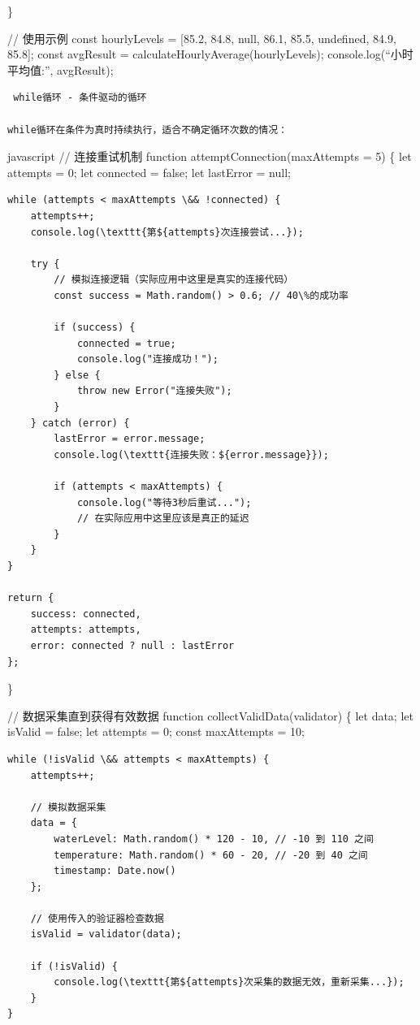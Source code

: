 {\}

// 使用示例 const hourlyLevels = {[}85.2, 84.8, null, 86.1, 85.5, undefined, 84.9, 85.8{]}; const avgResult = calculateHourlyAverage(hourlyLevels); console.log(``小时平均值:'', avgResult);

\begin{lstlisting}
 while循环 - 条件驱动的循环

while循环在条件为真时持续执行，适合不确定循环次数的情况：
\end{lstlisting}

javascript // 连接重试机制 function attemptConnection(maxAttempts = 5) \{ let attempts = 0; let connected = false; let lastError = null;

\begin{verbatim}
while (attempts < maxAttempts \&& !connected) {
    attempts++;
    console.log(\texttt{第${attempts}次连接尝试...});
    
    try {
        // 模拟连接逻辑（实际应用中这里是真实的连接代码）
        const success = Math.random() > 0.6; // 40\%的成功率
        
        if (success) {
            connected = true;
            console.log("连接成功！");
        } else {
            throw new Error("连接失败");
        }
    } catch (error) {
        lastError = error.message;
        console.log(\texttt{连接失败：${error.message}});
        
        if (attempts < maxAttempts) {
            console.log("等待3秒后重试...");
            // 在实际应用中这里应该是真正的延迟
        }
    }
}

return {
    success: connected,
    attempts: attempts,
    error: connected ? null : lastError
};
\end{verbatim}

\}

// 数据采集直到获得有效数据 function collectValidData(validator) \{ let data; let isValid = false; let attempts = 0; const maxAttempts = 10;

\begin{verbatim}
while (!isValid \&& attempts < maxAttempts) {
    attempts++;
    
    // 模拟数据采集
    data = {
        waterLevel: Math.random() * 120 - 10, // -10 到 110 之间
        temperature: Math.random() * 60 - 20, // -20 到 40 之间
        timestamp: Date.now()
    };
    
    // 使用传入的验证器检查数据
    isValid = validator(data);
    
    if (!isValid) {
        console.log(\texttt{第${attempts}次采集的数据无效，重新采集...});
    }
}


\end{verbatim}}
